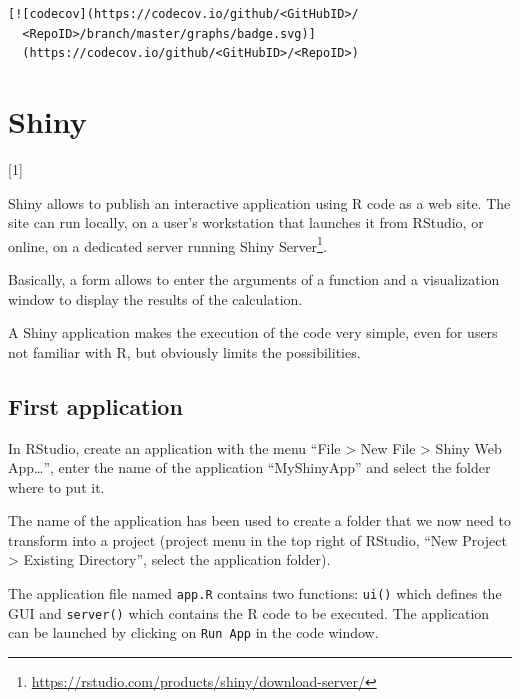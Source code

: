 \documentclass[
  12pt,
  american,
  a4paper,
  extrafontsizes,onecolumn,openright
  ]{memoir}
\newcommand{\toc}[1]{%
  \startcontents[chapters]%
  \printcontents[chapters]{}{1}[#1]{}%
  ~\newline%
}
\begin{document}
\begin{verbatim}
[![codecov](https://codecov.io/github/<GitHubID>/
  <RepoID>/branch/master/graphs/badge.svg)]
  (https://codecov.io/github/<GitHubID>/<RepoID>)
\end{verbatim}

\hypertarget{chap-shiny}{%
\chapter{Shiny}\label{chap-shiny}}

\toc{1}

Shiny allows to publish an interactive application using R code as a web site.
The site can run locally, on a user's workstation that launches it from RStudio, or online, on a dedicated server running Shiny Server\footnote{\url{https://rstudio.com/products/shiny/download-server/}}.

Basically, a form allows to enter the arguments of a function and a visualization window to display the results of the calculation.

A Shiny application makes the execution of the code very simple, even for users not familiar with R, but obviously limits the possibilities.

\hypertarget{first-application}{%
\section{First application}\label{first-application}}

In RStudio, create an application with the menu \enquote{File \textgreater{} New File \textgreater{} Shiny Web App\ldots{}}, enter the name of the application \enquote{MyShinyApp} and select the folder where to put it.

The name of the application has been used to create a folder that we now need to transform into a project (project menu in the top right of RStudio, \enquote{New Project \textgreater{} Existing Directory}, select the application folder).

The application file named \texttt{app.R} contains two functions: \texttt{ui()} which defines the GUI and \texttt{server()} which contains the R code to be executed.
The application can be launched by clicking on \texttt{Run\ App} in the code window.



\scriptsize
\end{document}
